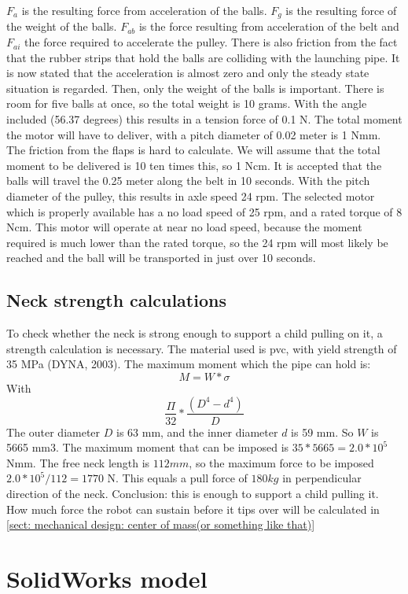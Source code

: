 \documentclass[11pt,twoside,a4paper]{report}
\begin{document}
$F_{a}$ is the resulting force from acceleration of the balls. $F_{g}$ is the resulting force of the weight of the balls. $F_{ab}$ is the force resulting from acceleration of the belt and $F_{­ai}$ the force required to accelerate the pulley.  There is also friction from the fact that the rubber strips that hold the balls are colliding with the launching pipe. It is now stated that the acceleration is almost zero and only the steady state situation is regarded. Then, only the weight of the balls is important. There is room for five balls at once, so the total weight is 10 grams. With the angle included (56.37 degrees) this results in a tension force of 0.1 N. The total moment the motor will have to deliver, with a pitch diameter of 0.02 meter is 1 Nmm. The friction from the flaps is hard to calculate. We will assume that the total moment to be delivered is 10 ten times this, so 1 Ncm. It is accepted that the balls will travel the 0.25 meter along the belt in 10 seconds. With the pitch diameter of the pulley, this results in axle speed 24 rpm. The selected motor which is properly available has a no load speed of 25 rpm, and a rated torque of 8 Ncm. This motor will operate at near no load speed, because the moment required is much lower than the rated torque, so the 24 rpm will most likely be reached and the ball will be transported in just over 10 seconds. 
\subsection{Neck strength calculations}
To check whether the neck is strong enough to support a child pulling on it, a strength calculation is necessary. The material used is pvc, with yield strength of 35 MPa (DYNA, 2003).
The maximum moment which the pipe can hold is:
\[M=W*\sigma\]
With
\[\frac{\Pi}{32}*\frac{(D^{4}-d^{4})}{D}\]
The outer diameter $D$ is 63 mm, and the inner diameter $d$ is 59 mm. So $W$ is 5665 mm3. The maximum moment that can be imposed is $35*5665= 2.0*10^5$ Nmm. 
The free neck length is $112 mm$, so the maximum force to be imposed $2.0*10^5/112 = 1770$ N. This equals a pull force of $180 kg$ in perpendicular direction of the neck. Conclusion: this is enough to support a child pulling it. How much force the robot can sustain before it tips over will be calculated in  \ref{sect: mechanical design: center of mass(or something like that)} 


\section{SolidWorks model}
\end{document}
